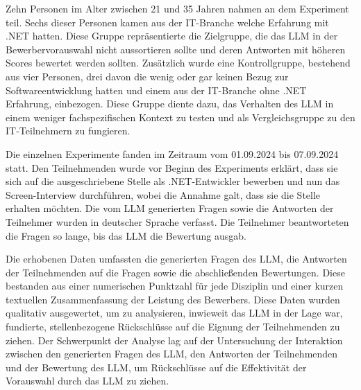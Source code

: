 Zehn Personen im Alter zwischen 21 und 35 Jahren nahmen an dem Experiment teil. 
Sechs dieser Personen kamen aus der IT-Branche welche Erfahrung mit .NET hatten. Diese Gruppe 
repräsentierte die Zielgruppe, die das \acs{LLM} in der Bewerbervorauswahl nicht aussortieren sollte und 
deren Antworten mit höheren Scores bewertet werden sollten. Zusätzlich wurde eine Kontrollgruppe, 
bestehend aus vier Personen, drei davon die wenig oder gar keinen Bezug zur Softwareentwicklung hatten und einem aus der IT-Branche ohne .NET Erfahrung, einbezogen. 
Diese Gruppe diente dazu, das Verhalten des \acs{LLM} in einem weniger fachspezifischen Kontext zu 
testen und als Vergleichsgruppe zu den IT-Teilnehmern zu fungieren. 


Die einzelnen Experimente fanden im Zeitraum vom 01.09.2024 bis 07.09.2024 statt. Den 
Teilnehmenden wurde vor Beginn des Experiments erklärt, dass sie sich auf die ausgeschriebene 
Stelle als .NET-Entwickler bewerben und nun das Screen-Interview durchführen, wobei die Annahme 
galt, dass sie die Stelle erhalten möchten. Die vom \acs{LLM} generierten Fragen sowie die Antworten der 
Teilnehmer wurden in deutscher Sprache verfasst. Die Teilnehmer beantworteten die Fragen so lange, 
bis das \acs{LLM} die Bewertung ausgab. 


Die erhobenen Daten umfassten die generierten Fragen des \acs{LLM}, die Antworten der Teilnehmenden auf 
die Fragen sowie die abschließenden Bewertungen. Diese bestanden aus einer numerischen Punktzahl 
für jede Disziplin und einer kurzen textuellen Zusammenfassung der Leistung des Bewerbers. 
Diese Daten wurden qualitativ ausgewertet, um zu analysieren, inwieweit das \acs{LLM} in der Lage war, 
fundierte, stellenbezogene Rückschlüsse auf die Eignung der Teilnehmenden zu ziehen. Der 
Schwerpunkt der Analyse lag auf der Untersuchung der Interaktion zwischen den generierten Fragen 
des \acs{LLM}, den Antworten der Teilnehmenden und der Bewertung des \acs{LLM}, um Rückschlüsse auf die 
Effektivität der Vorauswahl durch das \acs{LLM} zu ziehen. 






